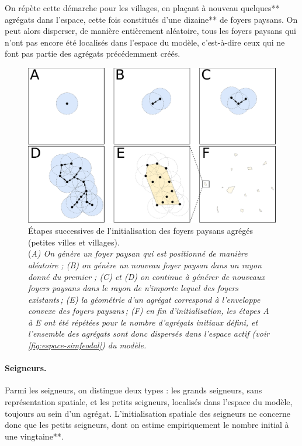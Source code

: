 On répète cette démarche pour les \og villages\fg{}, en plaçant à nouveau quelques** agrégats dans l'espace, cette fois constitués d'une dizaine** de foyers paysans.
On peut alors disperser, de manière entièrement aléatoire, tous les foyers paysans qui n'ont pas encore été localisés dans l'espace du modèle, c'est-à-dire ceux qui ne font pas partie des agrégats précédemment créés.

\vspace{-1em}\begin{figure}[H]
	\centering
	\includegraphics[width=.85\linewidth]{img/init_fp.pdf}
	\caption[Étapes successives de l'initialisation des foyers paysans agrégés (petites villes et villages).]{Étapes successives de l'initialisation des foyers paysans agrégés (petites villes et villages).\\
	(\textit{A) On génère un foyer paysan qui est positionné de manière aléatoire ;
	(B) on génère un nouveau foyer paysan dans un rayon donné du premier ;
	(C) et (D) on continue à générer de nouveaux foyers paysans dans le rayon de n'importe lequel des foyers existants ;
	(E) la géométrie d'un agrégat correspond à l'enveloppe convexe des foyers paysans ;
	(F) en fin d'initialisation, les étapes A à E ont été répétées pour le nombre d'agrégats initiaux défini, et l'ensemble des agrégats sont donc dispersés dans l'espace actif (voir \cref{fig:espace-simfeodal}) du modèle.}}
	\label{fig:init-fp}
\end{figure}
\clearpage

\paragraph{Seigneurs.}
Parmi les seigneurs, on distingue deux types : les grands seigneurs, sans représentation spatiale, et les petits seigneurs, localisés dans l'espace du modèle, toujours au sein d'un agrégat.
L'initialisation spatiale des seigneurs ne concerne donc que les petits seigneurs, dont on estime empiriquement le nombre initial à une vingtaine**.

